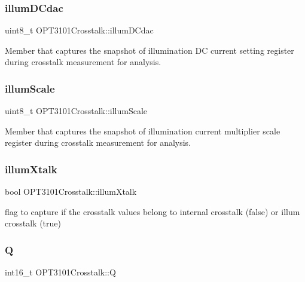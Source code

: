 \subsubsection{\texorpdfstring{illum\+D\+Cdac}{illumDCdac}}
{\footnotesize\ttfamily uint8\+\_\+t O\+P\+T3101\+Crosstalk\+::illum\+D\+Cdac}



Member that captures the snapshot of illumination DC current setting register during crosstalk measurement for analysis. 

\mbox{\label{class_o_p_t3101_crosstalk_a72a555c338dc5ee04b513c2165afa08f}} 
\subsubsection{\texorpdfstring{illum\+Scale}{illumScale}}
{\footnotesize\ttfamily uint8\+\_\+t O\+P\+T3101\+Crosstalk\+::illum\+Scale}



Member that captures the snapshot of illumination current multiplier scale register during crosstalk measurement for analysis. 

\mbox{\label{class_o_p_t3101_crosstalk_ac34c766af7381d501b1716fd8a0076db}} 
\subsubsection{\texorpdfstring{illum\+Xtalk}{illumXtalk}}
{\footnotesize\ttfamily bool O\+P\+T3101\+Crosstalk\+::illum\+Xtalk}



flag to capture if the crosstalk values belong to internal crosstalk (false) or illum crosstalk (true) 

\mbox{\label{class_o_p_t3101_crosstalk_a0454e10774015dd2e941f9284ea516da}} 
\subsubsection{\texorpdfstring{Q}{Q}}
{\footnotesize\ttfamily int16\+\_\+t O\+P\+T3101\+Crosstalk\+::Q}



